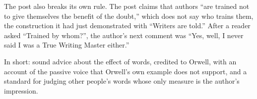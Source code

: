 \begin{afterword}
The post also breaks its own rule. The post claims that authors ``are trained not to give themselves the benefit of the doubt,'' which does not say who trains them, the construction it had just demonstrated with ``Writers are told.'' After a reader asked ``Trained by whom?'', the author's next comment was ``Yes, well, I never said I was a True Writing Master either.''

In short: sound advice about the effect of words, credited to Orwell, with an account of the passive voice that Orwell's own example does not support, and a standard for judging other people's words whose only measure is the author's impression.
\end{afterword}
